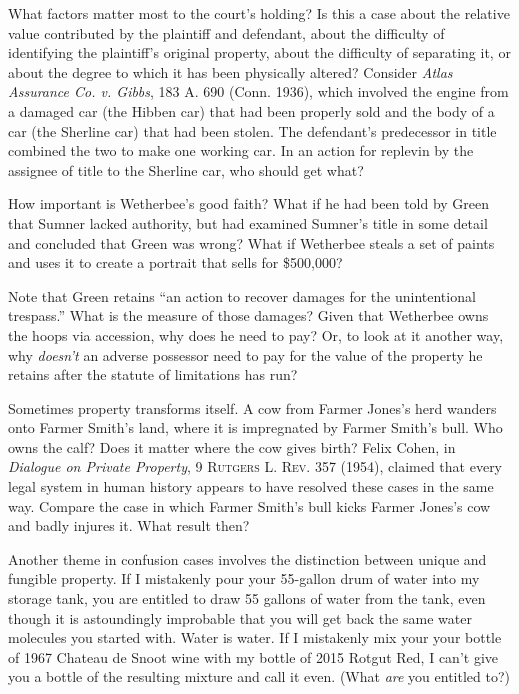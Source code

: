
\item What factors matter most to the court's holding? Is this a case about the
relative value contributed by the plaintiff and defendant, about the difficulty
of identifying the plaintiff's original property, about the difficulty of
separating it, or about the degree to which it has been physically altered?
Consider \textit{Atlas Assurance Co. v. Gibbs}, 183 A. 690 (Conn.
1936), which involved the engine from a damaged car (the Hibben car)
that had been properly sold and the body of a car (the Sherline car) that had
been stolen. The defendant's predecessor in title combined the two to make one
working car. In an action for replevin by the assignee of title to the Sherline
car, who should get what?


\item How important is Wetherbee's good faith? What if he had been told by Green
that Sumner lacked authority, but had examined Sumner's title in some detail
and concluded that Green was wrong? What if Wetherbee steals a set of paints
and uses it to create a portrait that sells for \$500,000?


\item Note that Green retains ``an action to recover damages for the
unintentional trespass.'' What is the measure of those damages? Given that
Wetherbee owns the hoops via accession, why does he need to pay? Or, to look
at it another way, why \textit{doesn't} an adverse possessor need to pay for
the value of the property he retains after the statute of limitations has run?


\item Sometimes property transforms itself. A cow from Farmer Jones's herd
wanders onto Farmer Smith's land, where it is impregnated by Farmer Smith's
bull. Who owns the calf? Does it matter where the cow gives birth? Felix Cohen,
in \textit{Dialogue on Private Property}, 9 \textsc{Rutgers
L. Rev.} 357 (1954), claimed that every legal system in human history appears
to have resolved these cases in the same way. Compare the case in which Farmer
Smith's bull kicks Farmer Jones's cow and badly injures it. What result then?


\item \label{wetherbee-v-green-q-fungible}
Another theme in confusion cases involves the distinction between unique
and fungible property. If I mistakenly pour your 55-gallon drum of water into
my storage tank, you are entitled to draw 55 gallons of water from the tank,
even though it is astoundingly improbable that you will get back the same water
molecules you started with. Water is water. If I mistakenly mix your your
bottle of 1967 Chateau de Snoot wine with my bottle of 2015 Rotgut Red, I can't
give you a bottle of the resulting mixture and call it even. (What \textit{are}
you entitled to?) 

